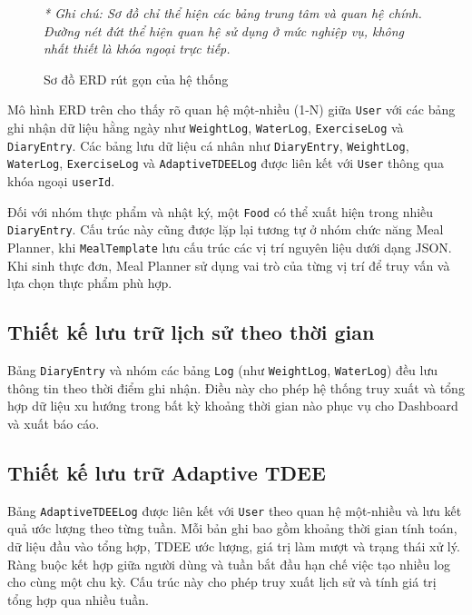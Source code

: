 \documentclass[12pt, a4paper]{report}
\begin{document}
\begin{figure}[htbp]
{
    }
    \caption{Sơ đồ ERD rút gọn của hệ thống}
    \label{fig:erd_rut_gon}
    
    \vspace{0.2cm}
    \small \textit{* Ghi chú: Sơ đồ chỉ thể hiện các bảng trung tâm và quan hệ chính. Đường nét đứt thể hiện quan hệ sử dụng ở mức nghiệp vụ, không nhất thiết là khóa ngoại trực tiếp.}
\end{figure}

Mô hình ERD trên cho thấy rõ quan hệ một-nhiều (1-N) giữa \texttt{User} với các bảng ghi nhận dữ liệu hằng ngày như \texttt{WeightLog}, \texttt{WaterLog}, \texttt{ExerciseLog} và \texttt{DiaryEntry}. Các bảng lưu dữ liệu cá nhân như \texttt{DiaryEntry}, \texttt{WeightLog}, \texttt{WaterLog}, \texttt{ExerciseLog} và \texttt{AdaptiveTDEELog} được liên kết với \texttt{User} thông qua khóa ngoại \texttt{userId}.

Đối với nhóm thực phẩm và nhật ký, một \texttt{Food} có thể xuất hiện trong nhiều \texttt{DiaryEntry}. Cấu trúc này cũng được lặp lại tương tự ở nhóm chức năng Meal Planner, khi \texttt{MealTemplate} lưu cấu trúc các vị trí nguyên liệu dưới dạng JSON. Khi sinh thực đơn, Meal Planner sử dụng vai trò của từng vị trí để truy vấn và lựa chọn thực phẩm phù hợp.

\subsection{Thiết kế lưu trữ lịch sử theo thời gian}
Bảng \texttt{DiaryEntry} và nhóm các bảng \texttt{Log} (như \texttt{WeightLog}, \texttt{WaterLog}) đều lưu thông tin theo thời điểm ghi nhận. Điều này cho phép hệ thống truy xuất và tổng hợp dữ liệu xu hướng trong bất kỳ khoảng thời gian nào phục vụ cho Dashboard và xuất báo cáo.

\subsection{Thiết kế lưu trữ Adaptive TDEE}
Bảng \texttt{AdaptiveTDEELog} được liên kết với \texttt{User} theo quan hệ một-nhiều và lưu kết quả ước lượng theo từng tuần. Mỗi bản ghi bao gồm khoảng thời gian tính toán, dữ liệu đầu vào tổng hợp, TDEE ước lượng, giá trị làm mượt và trạng thái xử lý. Ràng buộc kết hợp giữa người dùng và tuần bắt đầu hạn chế việc tạo nhiều log cho cùng một chu kỳ. Cấu trúc này cho phép truy xuất lịch sử và tính giá trị tổng hợp qua nhiều tuần.
\end{document}
